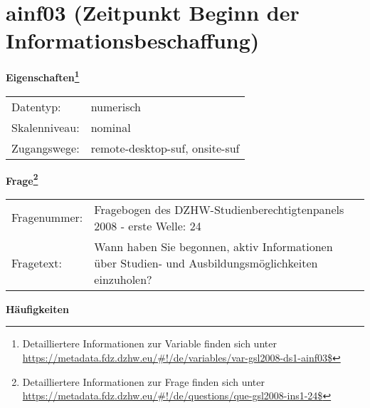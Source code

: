 
    \setcounter{footnote}{0}

    \vspace*{-1.8cm}
	\section{ainf03 (Zeitpunkt Beginn der Informationsbeschaffung)}
	\label{section:ainf03}



    \vspace*{0.5cm}
    \noindent\textbf{Eigenschaften\footnote{Detailliertere Informationen zur Variable finden sich unter
		\url{https://metadata.fdz.dzhw.eu/\#!/de/variables/var-gsl2008-ds1-ainf03$}}}\\
	\begin{tabularx}{\hsize}{@{}lX}
	Datentyp: & numerisch \\
	Skalenniveau: & nominal \\
	Zugangswege: &
	  remote-desktop-suf, 
	  onsite-suf
 \\
    \end{tabularx}



				\vspace*{0.5cm}
                \noindent\textbf{Frage\footnote{Detailliertere Informationen zur Frage finden sich unter
		              \url{https://metadata.fdz.dzhw.eu/\#!/de/questions/que-gsl2008-ins1-24$}}}\\
				\begin{tabularx}{\hsize}{@{}lX}
					Fragenummer: &
					  Fragebogen des DZHW-Studienberechtigtenpanels 2008 - erste Welle:
					  24
 \\
					Fragetext: & Wann haben Sie begonnen, aktiv Informationen über Studien- und Ausbildungsmöglichkeiten einzuholen? \\
				\end{tabularx}





        		\vspace*{0.5cm}
                \noindent\textbf{Häufigkeiten}

